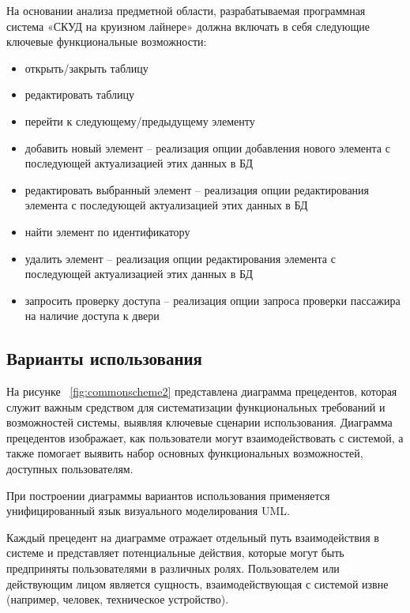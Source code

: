 На основании анализа предметной области, разрабатываемая программная система «СКУД на круизном лайнере» должна включать в себя следующие ключевые функциональные возможности:
\begin{itemize}
	\item открыть/закрыть таблицу
	\item редактировать таблицу
	\item перейти к следующему/предыдущему элементу
	\item добавить новый элемент -- реализация опции добавления нового элемента с последующей актуализацией этих данных в БД 
	\item редактировать выбранный элемент -- реализация опции редактирования элемента с последующей актуализацией этих данных в БД 
	\item найти элемент по идентификатору
	\item удалить элемент -- реализация опции редактирования элемента с последующей актуализацией этих данных в БД
	\item запросить проверку доступа -- реализация опции запроса проверки пассажира на наличие доступа к двери
\end{itemize}

\subsection{Варианты использования}

На рисунке  ~\ref{fig:commonscheme2} представлена диаграмма прецедентов, которая служит важным средством для систематизации функциональных требований и возможностей системы, выявляя ключевые сценарии использования. Диаграмма прецедентов изображает, как пользователи могут взаимодействовать с системой, а также помогает выявить набор основных функциональных возможностей, доступных пользователям.

При построении диаграммы вариантов использования применяется унифицированный язык визуального моделирования UML.

Каждый прецедент на диаграмме отражает отдельный путь взаимодействия в системе и представляет потенциальные действия, которые могут быть предприняты пользователями в различных ролях. Пользователем или действующим лицом является сущность, взаимодействующая с системой извне (например, человек, техническое устройство).

